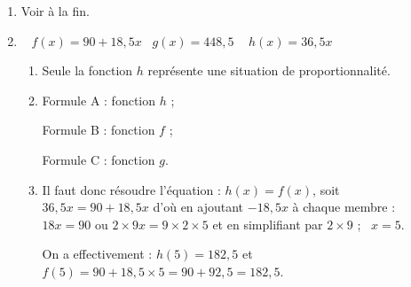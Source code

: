
\medskip

%
%	
%	
%

\begin{enumerate}
	\item %
Voir à la fin.	
	\item %
	
	
	\hfill~ $f(x) = 90 + 18,5x$\hfill~ $g(x) = 448,5$ \hfill~ $	h(x) = 36,5x$\hfill~
	
	\begin{enumerate}
		\item %
Seule la fonction $h$ représente une situation de proportionnalité.	
		\item %
Formule A : fonction $h$ ;

Formule B : fonction $f$ ;

Formule C : fonction $g$.	
		\item %
		Il faut donc résoudre l'équation : $h(x) = f(x)$, soit $36,5x = 90 + 18,5x$ d'où en ajoutant $- 18,5x$ à chaque membre : $18x = 90$ ou $2 \times 9 x = 9 \times 2 \times 5$ et en simplifiant par $2 \times 9$ ; \, $x = 5$.
		
On a effectivement : $h(5) = 182,5$ et $f(5) = 90 + 18,5 \times 5 = 90 + 92,5 = 182,5$.


\end{enumerate}
\end{enumerate}
